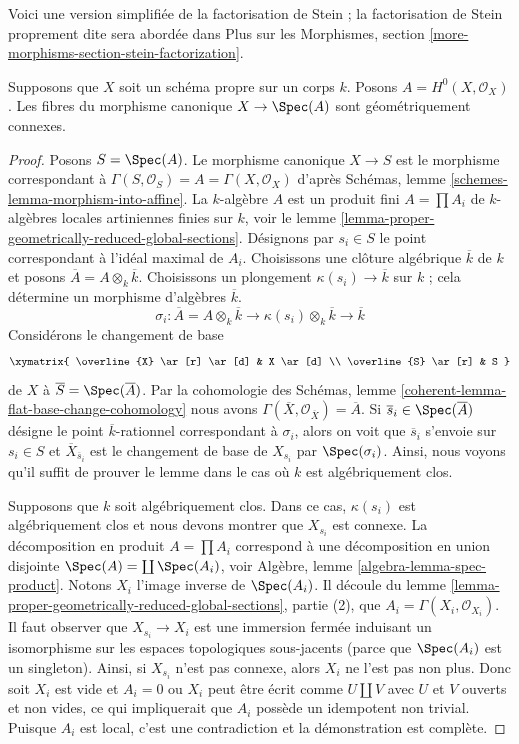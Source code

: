 \noindent
Voici une version simplifiée de la factorisation de Stein ; la
factorisation de Stein proprement dite sera abordée dans Plus sur les
Morphismes, section \ref{more-morphisms-section-stein-factorization}.

\begin{lemma}
\label{lemma-baby-stein}
Supposons que $X$ soit un schéma propre sur un corps $k$.
Posons $A = H^0(X, \mathcal{O}_X)$. Les fibres du morphisme
canonique $X \to \Spec(A)$ sont géométriquement connexes.
\end{lemma}

\begin{proof}
Posons $S = \Spec(A)$. Le morphisme canonique $X \to S$
est le morphisme correspondant à $\Gamma(S, \mathcal{O}_S)
= A = \Gamma(X, \mathcal{O}_X)$ d'après Schémas, lemme
\ref{schemes-lemma-morphism-into-affine}. La $k$-algèbre
$A$ est un produit fini $A = \prod A_i$ de $k$-algèbres
locales artiniennes finies sur $k$, voir le lemme
\ref{lemma-proper-geometrically-reduced-global-sections}.
Désignons par $s_i \in S$ le point correspondant à l'idéal
maximal de $A_i$. Choisissons une clôture algébrique
$\overline{k}$ de $k$ et posons $\overline{A} = A \otimes_k
\overline{k}$. Choisissons un plongement $\kappa(s_i) \to
\overline{k}$ sur $k$ ; cela détermine un morphisme d'algèbres $\overline{k}$.
$$
\sigma_i : \overline{A} = A \otimes_k \overline{k} \to
\kappa(s_i) \otimes_k \overline{k} \to \overline{k}
$$
Considérons le changement de base
$$
\xymatrix{
\overline{X} \ar[r] \ar[d] & X \ar[d] \\
\overline{S} \ar[r] & S
}
$$
de $X$ à $\overline{S} = \Spec(\overline{A})$. Par la
cohomologie des Schémas, lemme
\ref{coherent-lemma-flat-base-change-cohomology} nous avons
$\Gamma(\overline{X}, \mathcal{O}_{\overline{X}}) =
\overline{A}$. Si $\overline{s}_i \in \Spec(\overline{A})$
désigne le point $\overline{k}$-rationnel correspondant à
$\sigma_i$, alors on voit que $\overline{s}_i$ s'envoie sur $s_i
\in S$ et $\overline{X}_{\overline{s}_i}$ est le changement de
base de $X_{s_i}$ par $\Spec(\sigma_i)$. Ainsi, nous voyons qu'il
suffit de prouver le lemme dans le cas où $k$ est algébriquement clos.

\medskip\noindent
Supposons que $k$ soit algébriquement clos. Dans ce cas,
$\kappa(s_i)$ est algébriquement clos et nous devons montrer
que $X_{s_i}$ est connexe. La décomposition en produit $A =
\prod A_i$ correspond à une décomposition en union disjointe
$\Spec(A) = \coprod \Spec(A_i)$, voir Algèbre, lemme
\ref{algebra-lemma-spec-product}. Notons $X_i$ l'image
inverse de $\Spec(A_i)$. Il découle du lemme
\ref{lemma-proper-geometrically-reduced-global-sections},
partie (2), que $A_i = \Gamma(X_i, \mathcal{O}_{X_i})$. Il faut
observer que $X_{s_i} \to X_i$ est une immersion fermée
induisant un isomorphisme sur les espaces topologiques
sous-jacents (parce que $\Spec(A_i)$ est un singleton). Ainsi, si
$X_{s_i}$ n'est pas connexe, alors $X_i$ ne l'est pas non plus.
Donc soit $X_i$ est vide et $A_i = 0$ ou $X_i$ peut être écrit
comme $U \amalg V$ avec $U$ et $V$ ouverts et non vides, ce qui
impliquerait que $A_i$ possède un idempotent non trivial. Puisque
$A_i$ est local, c'est une contradiction et la démonstration est complète.
\end{proof}


